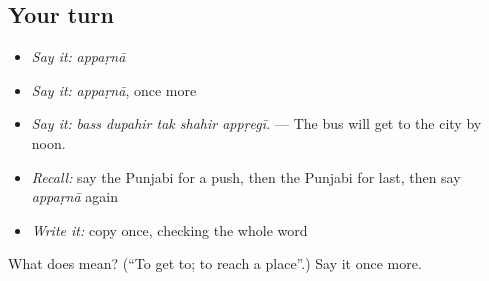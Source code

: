 \subsection*{Your turn}
\begin{itemize}
\raggedright
  \item \emph{Say it:} \emph{appaṛnā}
  \item \emph{Say it:} \emph{appaṛnā}, once more
  \item \emph{Say it:} \emph{bass dupahir tak shahir appṛegī.} — The bus will get to the city by noon.
  \item \emph{Recall:} say the Punjabi for a push, then the Punjabi for last, then say \emph{appaṛnā} again
  \item \emph{Write it:} copy \textbf{} once, checking the whole word
\end{itemize}

\begin{tcolorbox}[breakable,colback=teal!4,colframe=teal!35!black,title={Before you move on}]
What does  mean? (\textquotedblleft{}To get to; to reach a place\textquotedblright{}.) Say it once more.
\end{tcolorbox}
